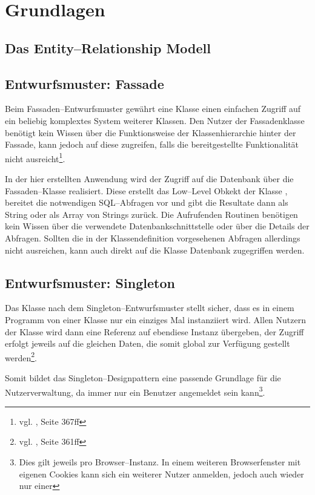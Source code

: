 \section{Grundlagen}
\subsection{Das Entity--Relationship Modell}
\subsection{Entwurfsmuster: Fassade}

Beim Fassaden--Entwurfsmuster gewährt eine Klasse einen einfachen Zugriff auf ein beliebig komplextes System weiterer Klassen. Den Nutzer der Fassadenklasse benötigt kein Wissen über die Funktionsweise der Klassenhierarchie hinter der Fassade, kann jedoch auf diese zugreifen, falls die bereitgestellte Funktionalität nicht ausreicht\footnote{vgl. \cite{Balzert}, Seite 367ff}.

In der hier erstellten Anwendung wird der Zugriff auf die Datenbank über die Fassaden--Klasse  realisiert. Diese erstellt das Low--Level Obkekt der Klasse , bereitet die notwendigen SQL--Abfragen vor und gibt die Resultate dann als String oder als Array von Strings zurück. Die Aufrufenden Routinen benötigen kein Wissen über die verwendete Datenbankschnittstelle oder über die Details der Abfragen. Sollten die in der Klassendefinition vorgesehenen Abfragen allerdings nicht ausreichen, kann auch direkt auf die Klasse Datenbank zugegriffen werden.

\subsection{Entwurfsmuster: Singleton}

Das Klasse nach dem Singleton--Entwurfsmuster stellt sicher, dass es in einem Programm von einer Klasse nur ein einziges Mal instanziiert wird. Allen Nutzern der Klasse wird dann eine Referenz auf ebendiese Instanz übergeben, der Zugriff erfolgt jeweils auf die gleichen Daten, die somit global zur Verfügung gestellt werden\footnote{vgl. \cite{Balzert}, Seite 361ff}.

Somit bildet das Singleton--Designpattern eine passende Grundlage für die Nutzerverwaltung, da immer nur ein Benutzer angemeldet sein kann\footnote{Dies gilt jeweils pro Browser--Instanz. In einem weiteren Browserfenster mit eigenen Cookies kann sich ein weiterer Nutzer anmelden, jedoch auch wieder nur einer}.

